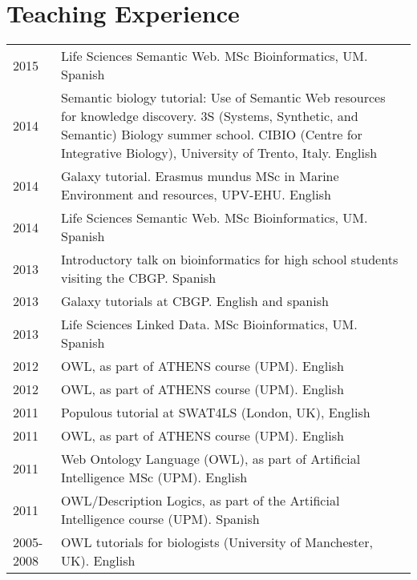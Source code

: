 \documentclass[11pt,fullpage]{article}
\begin{document}


\section*{Teaching Experience}

\begin{longtable}{p{0.5in}|p{5.5in}}

2015 & Life Sciences Semantic Web. MSc Bioinformatics, UM. Spanish \\
2014 & Semantic biology tutorial: Use of Semantic Web resources for knowledge discovery. 3S (Systems, Synthetic, and Semantic) Biology summer school. CIBIO (Centre for Integrative Biology), University of Trento, Italy. English \\
2014 & Galaxy tutorial. Erasmus mundus MSc in Marine Environment and resources, UPV-EHU. English \\
2014 & Life Sciences Semantic Web. MSc Bioinformatics, UM. Spanish \\ %
2013 & Introductory talk on bioinformatics for high school students visiting the CBGP. Spanish \\
2013 & Galaxy tutorials at CBGP. English and spanish \\ %
2013 & Life Sciences Linked Data. MSc Bioinformatics, UM. Spanish \\
2012 & OWL, as part of ATHENS course (UPM). English \\
2012 & OWL, as part of ATHENS course (UPM). English \\
2011 & Populous tutorial at SWAT4LS (London, UK), English \\
2011 & OWL, as part of ATHENS course (UPM). English \\
2011 & Web Ontology Language (OWL), as part of Artificial Intelligence MSc (UPM). English \\ %
2011 & OWL/Description Logics, as part of the Artificial Intelligence course (UPM). Spanish \\ %
2005-2008 & OWL tutorials for biologists (University of Manchester, UK). English \\

\end{longtable}
\end{document}

